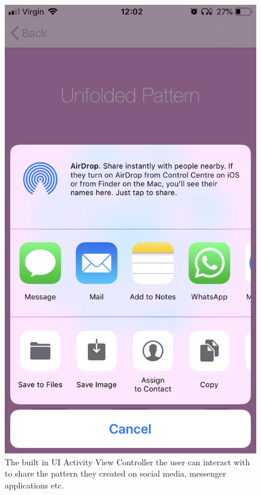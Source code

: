 \documentclass[11pt]{article}
\begin{document}
            \begin{figure}[!ht]
                        \begin{minipage}{0.45\textwidth}
                            \centering \includegraphics[width=0.7\linewidth]{KiriZen/share.png}
                            \caption{The built in UI Activity View Controller the user can interact with to share the pattern they created on social media, messenger applications etc.}
                            \label{fig:kiriZen-share}
                        \end{minipage}\hfill
                        \begin{minipage}{0.45\textwidth}
                            \centering

\end{minipage}
\end{figure}
\end{document}
